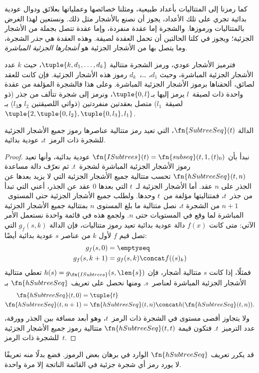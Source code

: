 \documentclass[../../../include/open-logic-section]{subfiles}
\begin{document}

كما رمزنا إلى المتتاليات بأعداد طبيعية، ومثلنا خصائصها وعملياتها
بعلائق ودوال عودية بدائية تجري على تلك الأعداد، يجوز أن نصنع
بالأشجار مثل ذلك. ونستعين لهذا الغرض بالمتتاليات ورموزها. والشجرة إما
عقدة منفردة، وإما عقدة تتصل بجملة من الأشجار
الجزئية؛ ويجوز في كلتا الحالتين أن تحمل العقدة لصيقة. وهذه العقدة هي \emph{جذر} الشجرة،
وما يتصل بها من الأشجار الجزئية هو \emph{أشجارها الجزئية المباشرة}.

فترميز الأشجار عودي، ورمز الشجرة متتالية $\tuple{k,d_1,\dots,d_k}$، حيث $k$ عدد
الأشجار الجزئية المباشرة، وحيث $d_1$، …،~$d_k$ رموز هذه الأشجار
الجزئية. فإن كانت للعقد لصائق، ألحقناها برموز الأشجار الجزئية
المباشرة. وعلى هذا فالشجرة المؤلفة من عقدة واحدة ذات لصيقة~$l$ يرمز إليها
بـ$\tuple{0,l}$، ونرمز إلى شجرة تتألف من جذر (ذو لصيقة~$l_1$) متصل
بعقدتين منفردتين (ذواتي اللصيقتين $l_2$ و$l_3$) بـ
$\tuple{2,\tuple{0,l_2},\tuple{0,l_3},l_1}$.

\begin{prop}
  الدالة $\fn{SubtreeSeq}(t)$، التي تعيد رمز متتالية عناصرها رموز جميع
  الأشجار الجزئية للشجرة ذات الرمز~$t$، عودية بدائية.
\end{prop}

\begin{proof}
  نبدأ بأن $\fn{ISubtrees}(t)=\fn{subseq}(t,1,(t)_0)$ عودية
  بدائية، وأنها تعيد رموز الأشجار الجزئية المباشرة لشجرة~$t$. ثم
  نعرّف دالة مساعدة $\fn{hSubtreeSeq}(t,n)$ تحسب متتالية جميع
  الأشجار الجزئية التي لا يزيد بعدها عن الجذر على $n$ عقد. أما الأشجار الجزئية
  لـ~$t$ التي بعدها $0$ عقد عن الجذر، أعني التي تبدأ من جذر~$t$، فمتتاليتها
  مؤلفة من~$t$ وحدها. ولطلب جميع الأشجار
  الجزئية حتى المستوى~$n+1$ من الشجرة $t$، نصل متتالية ما بلغ المستوى
  $n$ بمتتالية جميع الأشجار الجزئية المباشرة لما وقع في المستويات
  حتى $n$. ولجمع هذه في قائمة واحدة نستعمل الأمر الآتي: متى كانت $f(x)$ دالة عودية
  بدائية تعيد رموز متتاليات، فإن الدالة $g_f(s,k)$ التي تصل قيم $f$
  لأول $k$ من عناصر $s$ عودية بدائية أيضًا:
    \begin{align*}
      g_f(s, 0) & = \emptyseq\\
      g_f(s, k+1) & = g_f(s, k) \concat f((s)_k)
    \end{align*}
    فمثلًا، إذا كانت $s$ متتالية أشجار، فإن
    $h(s)=g_{\fn{ISubtrees}}(s,\len{s})$ تعطي متتالية الأشجار الجزئية
    المباشرة لعناصر~$s$. ومنها نحصل على تعريف
    $\fn{hSubtreeSeq}$ بـ
    \begin{align*}
      \fn{hSubtreeSeq}(t, 0) & = \tuple{t} \\
      \fn{hSubtreeSeq}(t, n+1) & = \fn{hSubtreeSeq}(t, n) \concat
      h(\fn{hSubtreeSeq}(t, n)).
    \end{align*}
    ولا يتجاوز أقصى مستوى في الشجرة ذات الرمز~$t$، وهو أبعد مسافة بين
    الجذر وورقة، عدد الترميز~$t$. فتكون قيمة
    $\fn{hSubtreeSeq}(t,t)$ متتالية رموز جميع الأشجار الجزئية للشجرة
    ذات الرمز~$t$.
\end{proof}

\begin{prob}
  قد يكرر تعريف $\fn{hSubtreeSeq}$ الوارد في برهان
   بعض الرموز. فضع بدلًا منه تعريفًا
  لا يورد رمز أي شجرة جزئية في القائمة الناتجة إلا مرة واحدة.
\end{prob}
\end{document}
